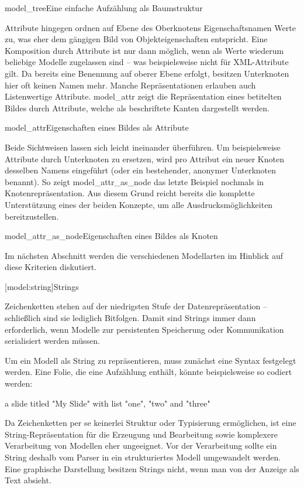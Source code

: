 \documentclass[11pt, a4paper, bibgerm]{scrbook}
\newenvironment{DIFnomarkup}{}{}
\newcommand\lsection{}
\newcommand\abb{}
\newcommand\fig{}
\begin{document}
\fig{model_tree}{Eine einfache Aufzählung als Baumstruktur}

Attribute hingegen ordnen auf Ebene des Oberknotens Eigenschaftsnamen
Werte zu, was eher dem gängigen Bild von Objekteigenschaften
entspricht. Eine Komposition durch Attribute ist nur dann möglich, wenn
als Werte wiederum beliebige Modelle zugelassen sind -- was
beispielsweise nicht für XML-Attribute gilt. Da bereits eine Benennung auf
oberer Ebene erfolgt, besitzen Unterknoten hier oft keinen Namen
mehr. Manche Repräsentationen erlauben auch Listenwertige
Attribute. \abb{model_attr} zeigt die Repräsentation eines betitelten
Bildes durch Attribute, welche als beschriftete Kanten dargestellt
werden.

\fig{model_attr}{Eigenschaften eines Bildes als Attribute}

Beide Sichtweisen lassen sich leicht ineinander überführen. Um
beispielsweise Attribute durch Unterknoten zu ersetzen, wird pro
Attribut ein neuer Knoten desselben Namens eingeführt (oder ein
bestehender, anonymer Unterknoten benannt). So zeigt
\abb{model_attr_as_node} das letzte Beispiel nochmals in
Knotenrepräsentation. Aus diesem Grund reicht bereits die komplette
Unterstützung eines der beiden Konzepte, um alle Ausdrucksmöglichkeiten
bereitzustellen.

\fig{model_attr_as_node}{Eigenschaften eines Bildes als Knoten}

\medskip{}

Im nächsten Abschnitt werden die verschiedenen Modellarten im Hinblick
auf diese Kriterien diskutiert.

\lsection[model:string]{Strings}

Zeichenketten stehen auf der niedrigsten Stufe der Datenrepräsentation --
schließlich sind sie lediglich Bitfolgen. Damit sind Strings immer dann
erforderlich, wenn Modelle zur persistenten Speicherung oder
Kommunikation serialisiert werden müssen.

Um ein Modell als String zu repräsentieren, muss zunächst eine Syntax
festgelegt werden. Eine Folie, die eine Aufzählung enthält, könnte
beispielsweise so codiert werden:
\begin{DIFnomarkup}\begin{code}
a slide titled "My Slide" with list "one", "two" and "three"  
\end{code}\end{DIFnomarkup}

Da Zeichenketten per se keinerlei Struktur oder Typisierung ermöglichen, ist
eine String-Repräsentation für die Erzeugung und Bearbeitung sowie
komplexere Verarbeitung von Modellen eher ungeeignet. Vor der
Verarbeitung sollte ein String deshalb vom Parser in ein strukturiertes
Modell umgewandelt werden. Eine graphische Darstellung besitzen Strings
nicht, wenn man von der Anzeige als Text absieht.
\end{document}
